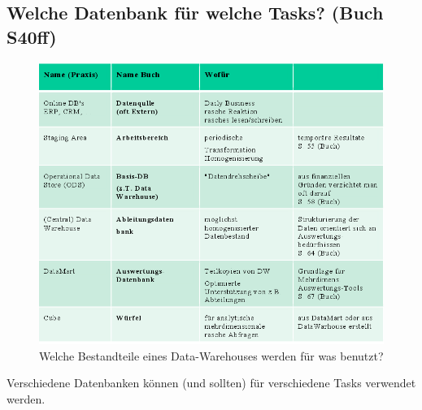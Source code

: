 \documentclass[a4paper, 11pt, nofootinbib]{article}
\begin{document}
\newpage

\subsection{Welche Datenbank für welche Tasks? (Buch S40ff)}

\begin{figure}[htb]
	\centering
	\includegraphics[keepaspectratio=true,height=18\baselineskip]{bestandteileDW.png}
	\caption{Welche Bestandteile eines Data-Warehouses werden für was benutzt?}
	\label{fig:bestDW}
\end{figure}


Verschiedene Datenbanken können (und sollten) für verschiedene Tasks verwendet werden.

\newpage
\end{document}
